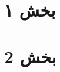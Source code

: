 \documentclass[12pt,a4paper,leqno,titlepage]{article}
\title{\titleeng} %
\theoremstyle{plain}
\theoremstyle{definition}
\theoremstyle{remark}
\begin{document}
	
	
	\clearpage
	\section{بخش ۱}
	
	\section{بخش 2}
	
%	
%	
%	
%	
%	
	\clearpage
	
	
\end{document}
